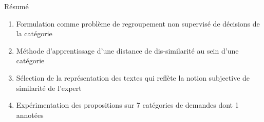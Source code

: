 \begin{frame}{Résumé}
	\begin{enumerate}
		\item Formulation comme problème de regroupement non supervisé de décisions de la catégorie
		\item Méthode d'apprentissage d'une distance de dis-similarité au sein d'une catégorie
		\item Sélection de la représentation des textes qui reflète la notion subjective de similarité de l'expert
		\item Expérimentation des propositions sur 7 catégories de demandes dont 1 annotées
	\end{enumerate}
\end{frame}
